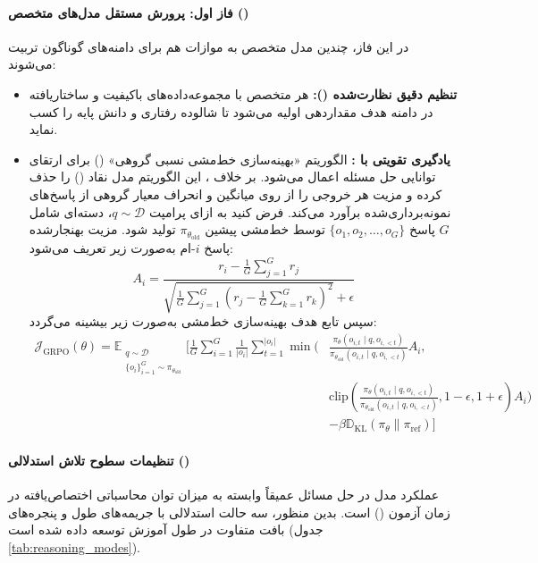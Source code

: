 \paragraph*{فاز اول: پرورش مستقل مدل‌های متخصص ()}
در این فاز، چندین مدل متخصص به موازات هم برای دامنه‌های گوناگون تربیت می‌شوند:
\begin{itemize}
    \item \textbf{تنظیم دقیق نظارت‌شده ():} هر متخصص با مجموعه‌داده‌های باکیفیت و ساختاریافته در دامنه هدف مقداردهی اولیه می‌شود تا شالوده رفتاری و دانش پایه را کسب نماید.
    \item \textbf{یادگیری تقویتی با :} الگوریتم «بهینه‌سازی خط‌مشی نسبی گروهی» () \cite{deepseek2025r1} برای ارتقای توانایی حل مسئله اعمال می‌شود. بر خلاف ، این الگوریتم مدل نقاد () را حذف کرده و مزیت هر خروجی را از روی میانگین و انحراف معیار گروهی از پاسخ‌های نمونه‌برداری‌شده برآورد می‌کند. فرض کنید به ازای پرامپت $q \sim \mathcal{D}$، دسته‌ای شامل $G$ پاسخ $\{o_1, o_2, \dots, o_G\}$ توسط خط‌مشی پیشین $\pi_{\theta_{\text{old}}}$ تولید شود. مزیت بهنجارشده پاسخ $i$-ام به‌صورت زیر تعریف می‌شود:
    \begin{equation}
        A_i = \frac{r_i - \frac{1}{G} \sum_{j=1}^G r_j}{\sqrt{\frac{1}{G} \sum_{j=1}^G \left( r_j - \frac{1}{G} \sum_{k=1}^G r_k \right)^2} + \epsilon}
    \end{equation}
    سپس تابع هدف بهینه‌سازی خط‌مشی به‌صورت زیر بیشینه می‌گردد:
    \begin{equation}
    \begin{aligned}
        \mathcal{J}_{\text{GRPO}}(\theta) = \mathbb{E}_{\substack{q \sim \mathcal{D} \\ \{o_i\}_{i=1}^G \sim \pi_{\theta_{\text{old}}}}} \Bigg[ \frac{1}{G} \sum_{i=1}^G \frac{1}{|o_i|} \sum_{t=1}^{|o_i|} \min \Bigg( & \frac{\pi_\theta(o_{i,t} \mid q, o_{i,<t})}{\pi_{\theta_{\text{old}}}(o_{i,t} \mid q, o_{i,<t})} A_i, \\
        & \text{clip}\left( \frac{\pi_\theta(o_{i,t} \mid q, o_{i,<t})}{\pi_{\theta_{\text{old}}}(o_{i,t} \mid q, o_{i,<t})}, 1-\epsilon, 1+\epsilon \right) A_i \Bigg) \\
        & - \beta \mathbb{D}_{\text{KL}}(\pi_\theta \parallel \pi_{\text{ref}}) \Bigg]
    \end{aligned}
    \end{equation}
\end{itemize}

\paragraph*{تنظیمات سطوح تلاش استدلالی ()}
عملکرد مدل در حل مسائل عمیقاً وابسته به میزان توان محاسباتی اختصاص‌یافته در زمان آزمون () است. بدین منظور، سه حالت استدلالی با جریمه‌های طول و پنجره‌های بافت متفاوت در طول آموزش  توسعه داده شده است (جدول \ref{tab:reasoning_modes}).

